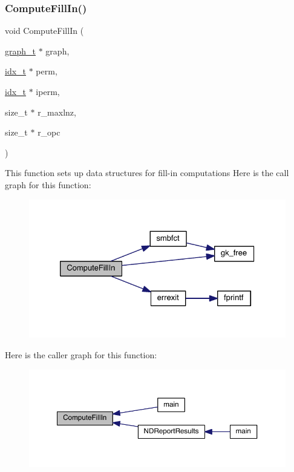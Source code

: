 \subsubsection{\texorpdfstring{Compute\+Fill\+In()}{ComputeFillIn()}}
{\footnotesize\ttfamily void Compute\+Fill\+In (\begin{DoxyParamCaption}\item[{\hyperlink{a00734}{graph\+\_\+t} $\ast$}]{graph,  }\item[{\hyperlink{a00876_aaa5262be3e700770163401acb0150f52}{idx\+\_\+t} $\ast$}]{perm,  }\item[{\hyperlink{a00876_aaa5262be3e700770163401acb0150f52}{idx\+\_\+t} $\ast$}]{iperm,  }\item[{size\+\_\+t $\ast$}]{r\+\_\+maxlnz,  }\item[{size\+\_\+t $\ast$}]{r\+\_\+opc }\end{DoxyParamCaption})}

This function sets up data structures for fill-\/in computations Here is the call graph for this function\+:\nopagebreak
\begin{figure}[H]
\begin{center}
\leavevmode
\includegraphics[width=326pt]{a00948_a929cf6af13d6bf71bc61657211472eed_cgraph}
\end{center}
\end{figure}
Here is the caller graph for this function\+:\nopagebreak
\begin{figure}[H]
\begin{center}
\leavevmode
\includegraphics[width=350pt]{a00948_a929cf6af13d6bf71bc61657211472eed_icgraph}
\end{center}
\end{figure}
\mbox{\label{a00948_a16087d53e4f04771ed2ffbd810711cba}} 
